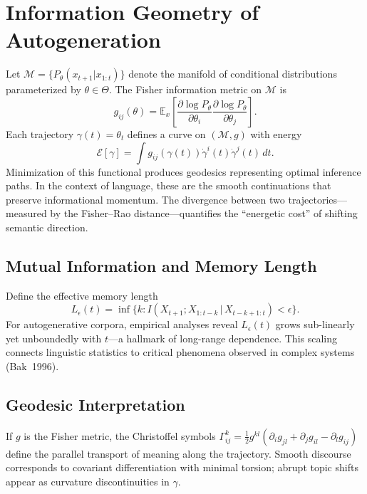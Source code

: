 \documentclass[12pt,a4paper,twoside,openright]{book}
\begin{document}
\section{Information Geometry of Autogeneration}
Let $\mathcal{M} = \{P_\theta(x_{t+1}|x_{1:t})\}$ denote the manifold of conditional distributions parameterized by $\theta \in \Theta$. The Fisher information metric on $\mathcal{M}$ is
\begin{equation}
g_{ij}(\theta) =
\mathbb{E}_x\!\left[
\frac{\partial \log P_\theta}{\partial \theta_i}
\frac{\partial \log P_\theta}{\partial \theta_j}
\right].
\end{equation}
Each trajectory $\gamma(t) = \theta_t$ defines a curve on $(\mathcal{M}, g)$ with energy
\begin{equation}
\mathcal{E}[\gamma] =
\int g_{ij}(\gamma(t)) \dot{\gamma}^i(t) \dot{\gamma}^j(t)\,dt.
\end{equation}
Minimization of this functional produces geodesics representing optimal inference paths. In the context of language, these are the smooth continuations that preserve informational momentum. The divergence between two trajectories—measured by the Fisher–Rao distance—quantifies the ``energetic cost'' of shifting semantic direction.

\subsection{Mutual Information and Memory Length}
Define the effective memory length
\begin{equation}
L_\epsilon(t) =
\inf\big\{k : I(X_{t+1}; X_{1:t-k}\,|\,X_{t-k+1:t}) < \epsilon\big\}.
\end{equation}
For autogenerative corpora, empirical analyses reveal $L_\epsilon(t)$ grows sub-linearly yet unboundedly with $t$—a hallmark of long-range dependence. This scaling connects linguistic statistics to critical phenomena observed in complex systems (Bak~1996).

\subsection{Geodesic Interpretation}
If $g$ is the Fisher metric, the Christoffel symbols
\(
\Gamma^k_{ij} = \tfrac{1}{2}g^{kl}(\partial_i g_{jl} + \partial_j g_{il} - \partial_l g_{ij})
\)
define the parallel transport of meaning along the trajectory. Smooth discourse corresponds to covariant differentiation with minimal torsion; abrupt topic shifts appear as curvature discontinuities in $\gamma$.
\end{document}
